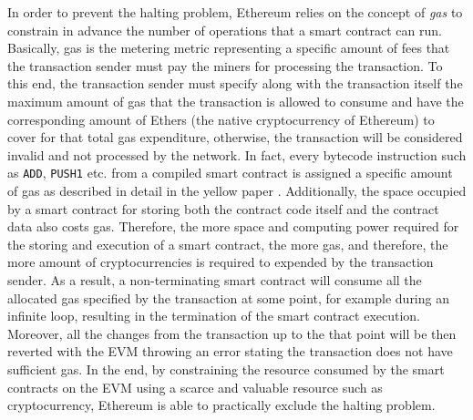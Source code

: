 In order to prevent the halting problem, Ethereum relies on the concept of \textit{gas} to constrain in advance the number of operations that a smart contract can run. Basically, gas is the metering metric representing a specific amount of fees that the transaction sender must pay the miners for processing the transaction. To this end, the transaction sender must specify along with the transaction itself the maximum amount of gas that the transaction is allowed to consume and have the corresponding amount of Ethers (the native cryptocurrency of Ethereum) to cover for that total gas expenditure, otherwise, the transaction will be considered invalid and not processed by the network. In fact, every bytecode instruction such as \texttt{ADD}, \texttt{PUSH1} etc. from a compiled smart contract is assigned a specific amount of gas as described in detail in the yellow paper \cite{wood2014ethereum}. Additionally, the space occupied by a smart contract for storing both the contract code itself and the contract data also costs gas. Therefore, the more space and computing power required for the storing and execution of a smart contract, the more gas, and therefore, the more amount of cryptocurrencies is required to expended by the transaction sender. As a result, a non-terminating smart contract will consume all the allocated gas specified by the transaction at some point, for example during an infinite loop, resulting in the termination of the smart contract execution. Moreover, all the changes from the transaction up to the that point will be then reverted with the EVM throwing an error stating the transaction does not have sufficient gas. In the end, by constraining the resource consumed by the smart contracts on the EVM using a scarce and valuable resource such as cryptocurrency, Ethereum is able to practically exclude the halting problem.





